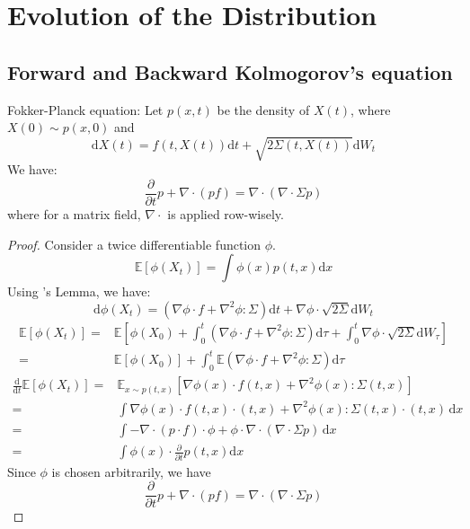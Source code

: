 \section{Evolution of the Distribution}
\subsection{Forward and Backward Kolmogorov's equation}
Fokker-Planck equation: Let $p(x,t)$ be the density of $X(t)$, where $X(0) \sim p(x,0)$ and
$$
\mathrm{d}X(t) = f(t,X(t))\mathrm{d}t + \sqrt{2\Sigma(t,X(t))}\mathrm{d}W_t
$$ 
We have:
$$
\frac{\partial}{\partial t}p+\nabla\cdot(pf) = \nabla\cdot(\nabla\cdot \Sigma p)
$$
where for a matrix field, $\nabla\cdot$ is applied row-wisely.
\begin{proof}
Consider a twice differentiable function $\phi$.
$$
\mathbb{E}[\phi(X_t)]=\int \phi(x)p(t,x)\mathrm{d}x
$$ 
Using \ito's Lemma, we have:
$$
\mathrm{d}\phi(X_t) = (\nabla\phi\cdot f+\nabla^2\phi:\Sigma)\mathrm{d}t+\nabla\phi\cdot\sqrt{2\Sigma}\mathrm{d}W_t
$$
\begin{equation*}
    \begin{aligned}
        \mathbb{E}\left[\phi(X_t)\right]=& \mathbb{E} \left[ \phi(X_0) + \int_{0}^{t}(\nabla\phi\cdot f+\nabla^2\phi:\Sigma)\mathrm{d}\tau +\int_{0}^{t} \nabla\phi\cdot\sqrt{2\Sigma}\mathrm{d}W_\tau \right] \\
        =&\mathbb{E}\left[\phi(X_0)\right] + \int_{0}^{t}\mathbb{E}(\nabla\phi\cdot f+\nabla^2\phi:\Sigma)\mathrm{d}\tau
    \end{aligned}
\end{equation*}
\begin{equation*}
    \begin{aligned}
        \frac{\mathrm{d}}{\mathrm{d}t}\mathbb{E}\left[\phi(X_t)\right]=& \mathbb{E}_{x\sim p(t,x)}\left[  \nabla\phi(x)\cdot f(t,x)+\nabla^2\phi(x):\Sigma(t,x)\right] \\
        =&\int \nabla\phi(x)\cdot f(t,x)\cdotp(t,x)+\nabla^2\phi(x):\Sigma(t,x)\cdotp(t,x)  \,\mathrm{d}x\\
        =&\int -\nabla\cdot(p\cdot f)\cdot \phi + \phi\cdot\nabla\cdot(\nabla\cdot\Sigma p) \,\mathrm{d}x\\
        =&\int\phi(x)\cdot\frac{\partial}{\partial t}p(t,x)\mathrm{d}x
    \end{aligned}
\end{equation*}
Since $\phi$ is chosen arbitrarily, we have
$$
\frac{\partial}{\partial t}p+\nabla\cdot(pf) = \nabla\cdot(\nabla\cdot \Sigma p)
$$
\end{proof}




